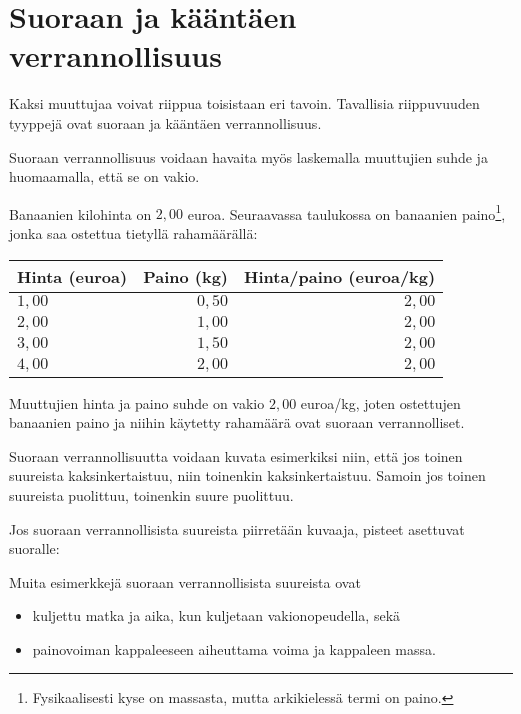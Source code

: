 \chapter{Suoraan ja kääntäen verrannollisuus}

Kaksi muuttujaa voivat riippua toisistaan eri tavoin. Tavallisia
riippuvuuden tyyppejä ovat suoraan ja kääntäen verrannollisuus.


Suoraan verrannollisuus voidaan havaita myös laskemalla muuttujien
suhde ja huomaamalla, että se on vakio.

\begin{esimerkki}
Banaanien kilohinta on $2,00$ euroa. Seuraavassa taulukossa on
banaanien paino\footnote{Fysikaalisesti kyse on massasta, mutta
arkikielessä termi on paino.}, jonka saa ostettua tietyllä rahamäärällä:
\begin{center} 
\begin{tabular}{|l|r|r|}
\hline
Hinta (euroa) & Paino (kg) & Hinta/paino (euroa/kg) \\
\hline
$1,00$ & $0,50$ & $2,00$ \\
$2,00$ & $1,00$ & $2,00$ \\
$3,00$ & $1,50$ & $2,00$ \\
$4,00$ & $2,00$ & $2,00$ \\
\hline
\end{tabular}
\end{center}
Muuttujien hinta ja paino suhde on vakio $2,00$ euroa/kg, joten ostettujen
banaanien paino ja niihin käytetty rahamäärä ovat suoraan verrannolliset.
\end{esimerkki}

Suoraan verrannollisuutta voidaan kuvata esimerkiksi niin, että jos
toinen suureista kaksinkertaistuu, niin toinenkin kaksinkertaistuu.
Samoin jos toinen suureista puolittuu, toinenkin suure puolittuu.

Jos suoraan verrannollisista suureista piirretään kuvaaja, pisteet
asettuvat suoralle:


Muita esimerkkejä suoraan verrannollisista suureista ovat
\begin{itemize}
    \item kuljettu matka ja aika, kun kuljetaan vakionopeudella, sekä
    \item painovoiman kappaleeseen aiheuttama voima ja kappaleen massa.
\end{itemize}


